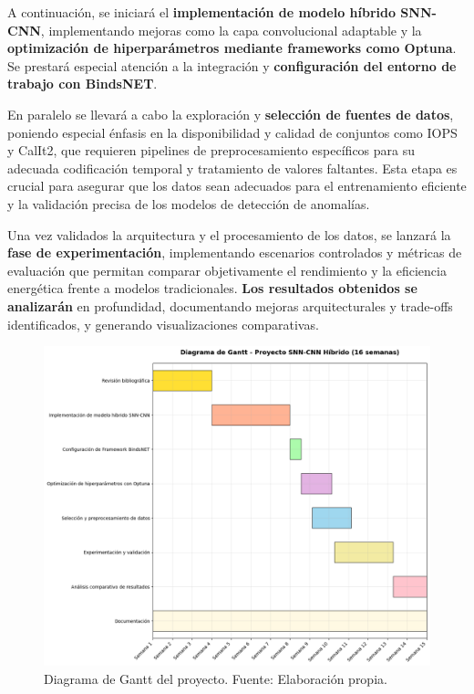 A continuación, se iniciará el \textbf{implementación de modelo híbrido SNN-CNN}, implementando mejoras como la capa convolucional adaptable y la \textbf{optimización de hiperparámetros mediante frameworks como Optuna}. Se prestará especial atención a la integración y \textbf{configuración del entorno de trabajo con BindsNET}.

En paralelo se llevará a cabo la exploración y \textbf{selección de fuentes de datos}, poniendo especial énfasis en la disponibilidad y calidad de conjuntos como IOPS y CalIt2, que requieren pipelines de preprocesamiento específicos para su adecuada codificación temporal y tratamiento de valores faltantes. Esta etapa es crucial para asegurar que los datos sean adecuados para el entrenamiento eficiente y la validación precisa de los modelos de detección de anomalías.

Una vez validados la arquitectura y el procesamiento de los datos, se lanzará la \textbf{fase de experimentación}, implementando escenarios controlados y métricas de evaluación que permitan comparar objetivamente el rendimiento y la eficiencia energética frente a modelos tradicionales. \textbf{Los resultados obtenidos se analizarán} en profundidad, documentando mejoras arquitecturales y trade-offs identificados, y generando visualizaciones comparativas.

\begin{figure}[p] %
    \centering
    \includegraphics[width=\paperwidth,height=\paperheight,keepaspectratio,angle=90]{Imagenes/Gantt.png}
    \caption{Diagrama de Gantt del proyecto. Fuente: Elaboración propia.}
    \label{fig:Diagrama de Gantt}
\end{figure}